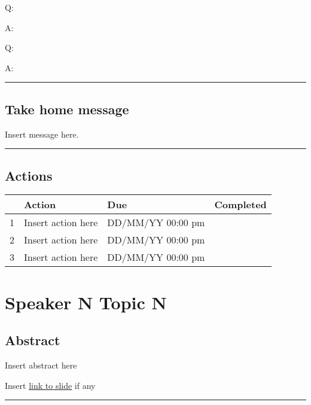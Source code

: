 \documentclass[
]{book}
\begin{document}
Q:

A:

Q:

A:

\begin{center}\rule{0.5\linewidth}{0.5pt}\end{center}

\hypertarget{take-home-message-4}{%
\section*{Take home message}\label{take-home-message-4}}

Insert message here.

\begin{center}\rule{0.5\linewidth}{0.5pt}\end{center}

\hypertarget{actions-4}{%
\section*{Actions}\label{actions-4}}

\begin{longtable}[]{@{}llll@{}}
\toprule
& Action & Due & Completed \\
\midrule
\endhead
1 & Insert action here & DD/MM/YY 00:00 pm & \\
2 & Insert action here & DD/MM/YY 00:00 pm & \\
3 & Insert action here & DD/MM/YY 00:00 pm & \\
\bottomrule
\end{longtable}

\hypertarget{speaker-n-topic-n-5}{%
\chapter{Speaker N Topic N}\label{speaker-n-topic-n-5}}

\hypertarget{abstract-5}{%
\section*{Abstract}\label{abstract-5}}

Insert abstract here

Insert \href{}{link to slide} if any

\begin{center}\rule{0.5\linewidth}{0.5pt}\end{center}
\end{document}
